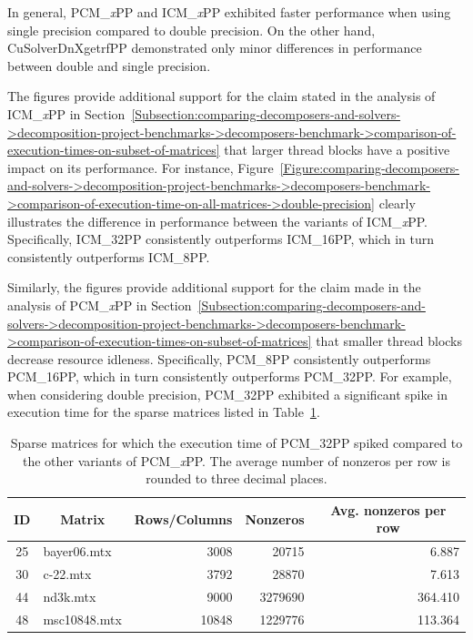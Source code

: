 In general, PCM\_\textit{x}PP and ICM\_\textit{x}PP exhibited faster performance when using single precision compared to double precision.
On the other hand, CuSolverDnXgetrfPP demonstrated only minor differences in performance between double and single precision.

The figures provide additional support for the claim stated in the analysis of ICM\_\textit{x}PP in Section~\ref{Subsection:comparing-decomposers-and-solvers->decomposition-project-benchmarks->decomposers-benchmark->comparison-of-execution-times-on-subset-of-matrices} that larger thread blocks have a positive impact on its performance.
For instance, Figure~\ref{Figure:comparing-decomposers-and-solvers->decomposition-project-benchmarks->decomposers-benchmark->comparison-of-execution-time-on-all-matrices->double-precision} clearly illustrates the difference in performance between the variants of ICM\_\textit{x}PP.
Specifically, ICM\_32PP consistently outperforms ICM\_16PP, which in turn consistently outperforms ICM\_8PP.

Similarly, the figures provide additional support for the claim made in the analysis of PCM\_\textit{x}PP in Section~\ref{Subsection:comparing-decomposers-and-solvers->decomposition-project-benchmarks->decomposers-benchmark->comparison-of-execution-times-on-subset-of-matrices} that smaller thread blocks decrease resource idleness.
Specifically, PCM\_8PP consistently outperforms PCM\_16PP, which in turn consistently outperforms PCM\_32PP.
For example, when considering double precision, PCM\_32PP exhibited a significant spike in execution time for the sparse matrices listed in Table~\ref{Table:comparing-decomposers-and-solvers->decomposition-project-benchmarks->decomposers-benchmark->comparison-of-execution-time-on-all-matrices->sparse-matrices-that-execution-time-of-pcm32pp-spiked-on}.

\begin{table}[ht!]
	\centering
	\begin{tabular}{|c|l|r|r|r|}
		\hline
		\rowcolor[HTML]{C0C0C0} \textbf{ID} & \multicolumn{1}{|c|}{\textbf{Matrix}} & \multicolumn{1}{c|}{\textbf{Rows/Columns}} & \multicolumn{1}{c|}{\textbf{Nonzeros}} & \multicolumn{1}{c|}{\textbf{Avg. nonzeros per row}} \\ \hline
		25 & bayer06.mtx  &  3008 &   20715 &   6.887 \\
		30 & c-22.mtx     &  3792 &   28870 &   7.613 \\
		44 & nd3k.mtx     &  9000 & 3279690 & 364.410 \\
		48 & msc10848.mtx & 10848 & 1229776 & 113.364 \\ \hline
	\end{tabular}
	\caption{Sparse matrices for which the execution time of PCM\_32PP spiked compared to the other variants of PCM\_\textit{x}PP.
		The average number of nonzeros per row is rounded to three decimal places.
	}
	\label{Table:comparing-decomposers-and-solvers->decomposition-project-benchmarks->decomposers-benchmark->comparison-of-execution-time-on-all-matrices->sparse-matrices-that-execution-time-of-pcm32pp-spiked-on}
\end{table}


